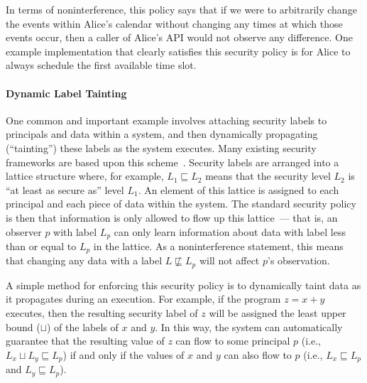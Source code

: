 In terms of noninterference, this policy says that if we were to arbitrarily
change the events within Alice's calendar without changing any times at
which those events occur, then a caller of Alice's API would not observe any
difference. One example implementation that clearly satisfies this security
policy is for Alice to always schedule the first available time slot.

\paragraph{Dynamic Label Tainting}
One common and important example involves attaching security labels to 
principals and data within a system, and then dynamically propagating 
(``tainting'') these labels 
as the system executes. Many existing security frameworks are based upon
this scheme~\cite{stuff,stuff,stuff}. Security labels are arranged into
a lattice structure where, for example, $L_1 \sqsubseteq L_2$ means that the
security level $L_2$ is ``at least as secure as'' level $L_1$. An element of
this lattice is assigned to each principal and each piece of data
within the system. The standard security policy is then that information is 
only allowed to flow up this lattice~--- that is, an observer $p$ with
label $L_p$ can only learn information about data with label less than or
equal to $L_p$ in the lattice. As a noninterference statement, this means 
that changing any data with a label $L \not\sqsubseteq L_p$ will
not affect $p$'s observation.

A simple method for enforcing this security policy is to dynamically 
taint data as it propagates during an execution. For example,
if the program $z = x + y$ executes, then the resulting security label 
of $z$ will be assigned the least upper bound ($\sqcup$) of the labels 
of $x$ and $y$. In this way, the system can automatically guarantee that
the resulting value of $z$ can flow to some principal $p$ (i.e., 
$L_x \sqcup L_y \sqsubseteq L_p$) if and only if the values of $x$ and $y$ 
can also flow to $p$ (i.e., $L_x \sqsubseteq L_p$ and $L_y \sqsubseteq L_p$).




